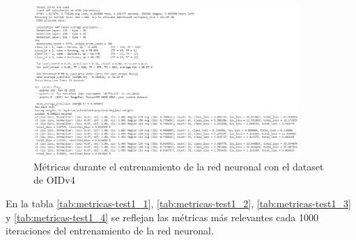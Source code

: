 \begin{figure}[ht]
\centering
\includegraphics[width=0.9\textwidth]{img/chapters/resultados/metricas/metrics-during-training.png}
\caption{\label{fig:metrics-during-train}Métricas durante el entrenamiento de la red neuronal con el dataset de OIDv4}
\end{figure}

En la tabla \ref{tab:metricas-test1_1}, \ref{tab:metricas-test1_2}, \ref{tab:metricas-test1_3} y \ref{tab:metricas-test1_4} se reflejan las métricas más relevantes cada 1000 iteraciones del entrenamiento de la red neuronal.

\newpage


